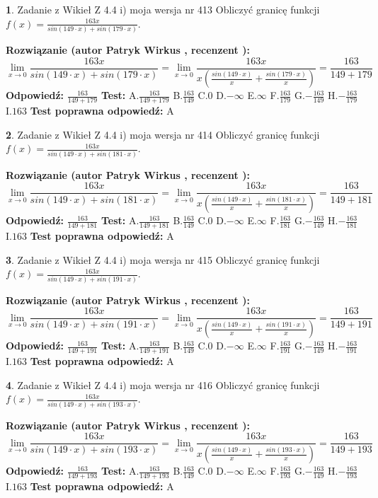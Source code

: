 \documentclass[12pt, a4paper]{article}
\theoremstyle{definition} %
\newtheorem{zad}{}
\newcommand{\zadStart}[1]{\begin{zad}#1\newline}
\newcommand{\zadStop}{\end{zad}}
\newcommand{\rozwStart}[2]{\noindent \textbf{Rozwiązanie (autor #1 , recenzent #2): }\newline}
\newcommand{\rozwStop}{\newline}
\newcommand{\odpStart}{\noindent \textbf{Odpowiedź:}\newline}
\newcommand{\odpStop}{\newline}
\newcommand{\testStart}{\noindent \textbf{Test:}\newline}
\newcommand{\testStop}{\newline}
\newcommand{\kluczStart}{\noindent \textbf{Test poprawna odpowiedź:}\newline}
\newcommand{\kluczStop}{\newline}
\begin{document}
\zadStart{Zadanie z Wikieł Z 4.4 i) moja wersja nr 413}
Obliczyć granicę funkcji $f(x)=\frac{163x}{sin(149\cdot x) +sin(179\cdot x)}$.
\zadStop
\rozwStart{Patryk Wirkus}{}
$$\lim\limits_{x\to 0}\frac{163x}{sin(149\cdot x) +sin(179\cdot x)}=\lim\limits_{x\to 0}\frac{163x}{x(\frac{sin(149\cdot x)}{x}+\frac{sin(179\cdot x)}{x})}=\frac{163}{149+179}$$
\rozwStop
\odpStart
$\frac{163}{149+179}$
\odpStop
\testStart
A.$\frac{163}{149+179}$
B.$\frac{163}{149}$
C.$0$
D.$-\infty$
E.$\infty$
F.$\frac{163}{179}$
G.$-\frac{163}{149}$
H.$-\frac{163}{179}$
I.$163$
\testStop
\kluczStart
A
\kluczStop



\zadStart{Zadanie z Wikieł Z 4.4 i) moja wersja nr 414}
Obliczyć granicę funkcji $f(x)=\frac{163x}{sin(149\cdot x) +sin(181\cdot x)}$.
\zadStop
\rozwStart{Patryk Wirkus}{}
$$\lim\limits_{x\to 0}\frac{163x}{sin(149\cdot x) +sin(181\cdot x)}=\lim\limits_{x\to 0}\frac{163x}{x(\frac{sin(149\cdot x)}{x}+\frac{sin(181\cdot x)}{x})}=\frac{163}{149+181}$$
\rozwStop
\odpStart
$\frac{163}{149+181}$
\odpStop
\testStart
A.$\frac{163}{149+181}$
B.$\frac{163}{149}$
C.$0$
D.$-\infty$
E.$\infty$
F.$\frac{163}{181}$
G.$-\frac{163}{149}$
H.$-\frac{163}{181}$
I.$163$
\testStop
\kluczStart
A
\kluczStop



\zadStart{Zadanie z Wikieł Z 4.4 i) moja wersja nr 415}
Obliczyć granicę funkcji $f(x)=\frac{163x}{sin(149\cdot x) +sin(191\cdot x)}$.
\zadStop
\rozwStart{Patryk Wirkus}{}
$$\lim\limits_{x\to 0}\frac{163x}{sin(149\cdot x) +sin(191\cdot x)}=\lim\limits_{x\to 0}\frac{163x}{x(\frac{sin(149\cdot x)}{x}+\frac{sin(191\cdot x)}{x})}=\frac{163}{149+191}$$
\rozwStop
\odpStart
$\frac{163}{149+191}$
\odpStop
\testStart
A.$\frac{163}{149+191}$
B.$\frac{163}{149}$
C.$0$
D.$-\infty$
E.$\infty$
F.$\frac{163}{191}$
G.$-\frac{163}{149}$
H.$-\frac{163}{191}$
I.$163$
\testStop
\kluczStart
A
\kluczStop



\zadStart{Zadanie z Wikieł Z 4.4 i) moja wersja nr 416}
Obliczyć granicę funkcji $f(x)=\frac{163x}{sin(149\cdot x) +sin(193\cdot x)}$.
\zadStop
\rozwStart{Patryk Wirkus}{}
$$\lim\limits_{x\to 0}\frac{163x}{sin(149\cdot x) +sin(193\cdot x)}=\lim\limits_{x\to 0}\frac{163x}{x(\frac{sin(149\cdot x)}{x}+\frac{sin(193\cdot x)}{x})}=\frac{163}{149+193}$$
\rozwStop
\odpStart
$\frac{163}{149+193}$
\odpStop
\testStart
A.$\frac{163}{149+193}$
B.$\frac{163}{149}$
C.$0$
D.$-\infty$
E.$\infty$
F.$\frac{163}{193}$
G.$-\frac{163}{149}$
H.$-\frac{163}{193}$
I.$163$
\testStop
\kluczStart
A
\kluczStop
\end{document}
